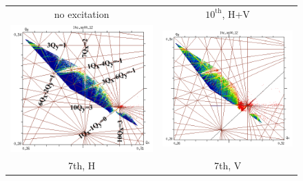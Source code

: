 \documentclass[%
 reprint,
 amsmath,amssymb,
 aps,
prstab,
longbibliography
]{revtex4-1}
\newlength{\fmawidth}
\begin{document}
\begin{figure}
  \begin{tabular}{cc}
    no excitation & $10^{\mathrm{th}}$, H+V \\
    \includegraphics[width=\fmawidth]{2016injnocolc15o+19_6noerru_dp0_ord10_annotate.png} &
    \includegraphics[width=\fmawidth]{2016injnocolc15o+19_6noerrut10skhv_dp0_ord10.png}
    \\
    7th, H & 7th, V \\

\end{tabular}
\end{figure}
\end{document}
